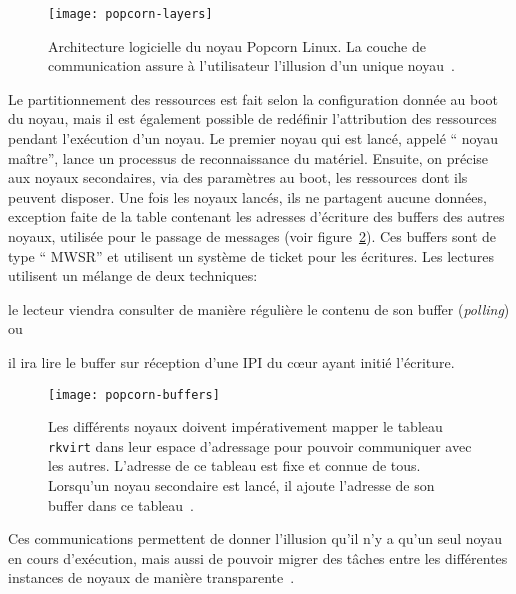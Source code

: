       \begin{figure}[ht]
        \centering
        \texttt{[image: popcorn-layers]}
        \caption{Architecture logicielle du noyau Popcorn Linux. La couche de
          communication assure à l'utilisateur l'illusion d'un unique
          noyau~\citep{barbalacepopcorn}.}
        \label{fig:popcorn-layers}
      \end{figure}

      Le partitionnement des ressources est fait selon la configuration donnée
      au boot du noyau, mais il est également possible de redéfinir
      l'attribution des ressources pendant l'exécution d'un noyau. Le premier
      noyau qui est lancé, appelé `` noyau maître'', lance un processus de
      reconnaissance du matériel. Ensuite, on précise aux noyaux secondaires,
      via des paramètres au boot, les ressources dont ils peuvent disposer. Une
      fois les noyaux lancés, ils ne partagent aucune données, exception faite
      de la table contenant les adresses d’écriture des buffers des autres
      noyaux, utilisée pour le passage de messages (voir
      figure~\ref{fig:popcorn-buf}). Ces buffers sont de type ``
      MWSR'' et utilisent un
      système de ticket pour les écritures. Les lectures utilisent un mélange de
      deux techniques:\benumline \item le lecteur viendra consulter de manière
      régulière le contenu de son buffer (\textit{polling}) ou \item il ira lire
      le buffer sur réception d’une IPI du c\oe ur ayant initié l’écriture\eenumline.

      \begin{figure}[ht]
        \centering
        \texttt{[image: popcorn-buffers]}
        \caption{Les différents noyaux doivent impérativement mapper le tableau
          \texttt{rkvirt} dans leur espace d'adressage pour pouvoir communiquer
          avec les autres. L'adresse de ce tableau est fixe et connue de tous.
          Lorsqu'un noyau secondaire est lancé, il ajoute l'adresse de son
          buffer dans ce tableau~\citep{barbalacepopcorn}.}
        \label{fig:popcorn-buf}
      \end{figure}

      Ces communications permettent de donner l’illusion qu’il n’y a qu’un seul
      noyau en cours d’exécution, mais aussi de pouvoir migrer des tâches entre
      les différentes instances de noyaux de manière
      transparente~\citep{katz2013popcorn}.\\


